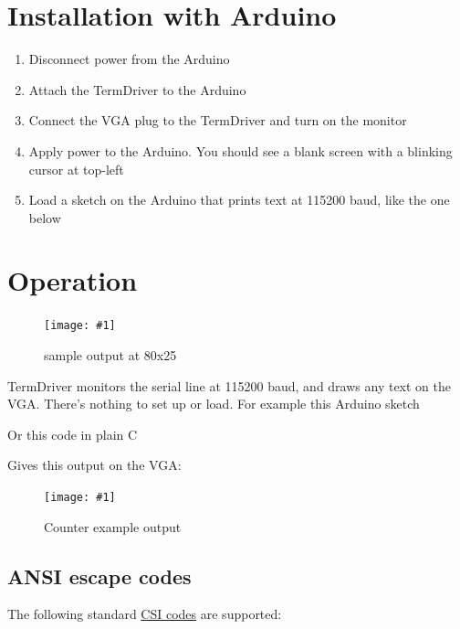\documentclass{article}
\newcommand{\png}[2]{
\begin{figure}[H]
\begin{center}
\texttt{[image: \#1]}
\caption{#2}
\end{center}
\end{figure}
}
\begin{document}
\newpage
\section{Installation with Arduino}

\begin{enumerate}
\item Disconnect power from the Arduino
\item Attach the TermDriver to the Arduino
\item Connect the VGA plug to the TermDriver and turn on the monitor
\item Apply power to the Arduino. You should see a blank screen with a blinking cursor at top-left
\item Load a sketch on the Arduino that prints text at 115200 baud, like the one below
\end{enumerate}

\newcommand{\eg}[1]{
\begin{framed}

\end{framed}
}

\eg{termdriver-helloworld}

\section{Operation}

\png{img/termdriver/page1}{sample output at 80x25}

TermDriver monitors the serial line at 115200 baud, and draws any
text on the VGA.
There's nothing to set up or load.
For example this Arduino sketch

\eg{termdriver-counter1}

\noindent
Or this code in plain C

\eg{termdriver-counter2}

\noindent
Gives this output on the VGA:

\png{img/termdriver/page2}{Counter example output}

\subsection{ANSI escape codes}

The following standard
\href{https://en.wikipedia.org/wiki/ANSI_escape_code\#CSI_sequences}{CSI codes}
are supported:
\end{document}

